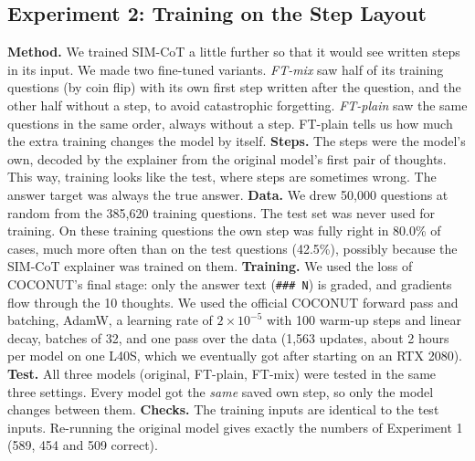 \documentclass[10pt,letterpaper]{article}
\newcommand{\step}[1]{\texttt{\small #1}}
\begin{document}
\subsection{Experiment 2: Training on the Step Layout}
\textbf{Method.} We trained SIM-CoT a little further so that it would see written steps in its input. We made two fine-tuned variants. \newline
\emph{FT-mix} saw half of its training questions (by
coin flip) with its own first step written after the question, and the other half without a step, to avoid catastrophic forgetting. \newline
\emph{FT-plain}
saw the same questions in the same order, always without a step. FT-plain tells us how much the extra training
changes the model by itself. \newline
\textbf{Steps.} The steps were the model's own, decoded by the explainer from the original model's first pair of thoughts. This way, training looks like the test, where steps are sometimes wrong. The answer target was always the true answer. \newline
\textbf{Data.} We drew 50{,}000 questions at random from the 385{,}620 training questions. The test set was never
used for training. On these training questions the own step was fully right in 80.0\% of cases, much more often than on the test questions (42.5\%), possibly because the SIM-CoT explainer was trained on them. \newline
\textbf{Training.} We used the loss of COCONUT's final stage: only the answer text (\step{\#\#\# N}) is graded, and
gradients flow through the 10 thoughts. We used the official COCONUT forward pass and batching, AdamW, a learning
rate of $2\times10^{-5}$ with 100 warm-up steps and linear decay, batches of 32, and one pass over the data (1{,}563
updates, about 2 hours per model on one L40S, which we eventually got after starting on an RTX 2080). \newline
\textbf{Test.} All three models (original, FT-plain, FT-mix) were tested in the same three settings. Every model got the \emph{same} saved own step, so only the model changes between them.
\textbf{Checks.} The training inputs are identical to the test inputs. Re-running the original model gives exactly the numbers of Experiment 1 (589, 454 and 509 correct).
\end{document}
